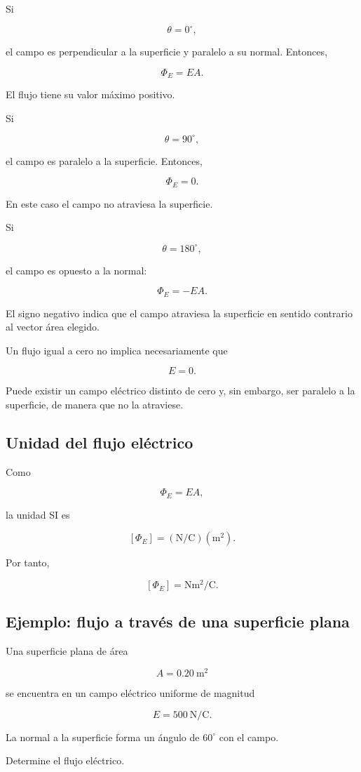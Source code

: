 Si

\[
\theta=0^\circ,
\]

el campo es perpendicular a la superficie y paralelo a su normal. Entonces,

\[
\Phi_E=EA.
\]

El flujo tiene su valor máximo positivo.

Si

\[
\theta=90^\circ,
\]

el campo es paralelo a la superficie. Entonces,

\[
\boxed{\Phi_E=0}.
\]

En este caso el campo no atraviesa la superficie.

Si

\[
\theta=180^\circ,
\]

el campo es opuesto a la normal:

\[
\boxed{\Phi_E=-EA}.
\]

El signo negativo indica que el campo atraviesa la superficie en sentido contrario al
vector área elegido.


\begin{advertencia}

Un flujo igual a cero no implica necesariamente que

\[
E=0.
\]

Puede existir un campo eléctrico distinto de cero y, sin embargo, ser paralelo a la
superficie, de manera que no la atraviese.

\end{advertencia}


\subsection{Unidad del flujo eléctrico}

Como

\[
\Phi_E=EA,
\]

la unidad SI es

\[
[\Phi_E]
=
\left(\si{\newton\per\coulomb}\right)
\left(\si{\metre\squared}\right).
\]

Por tanto,

\[
\boxed{
[\Phi_E]=\si{\newton\metre\squared\per\coulomb}
}.
\]


\subsection{Ejemplo: flujo a través de una superficie plana}

\begin{ejemplo}

Una superficie plana de área

\[
A=\SI{0.20}{\metre\squared}
\]

se encuentra en un campo eléctrico uniforme de magnitud

\[
E=\SI{500}{\newton\per\coulomb}.
\]

La normal a la superficie forma un ángulo de \(60^\circ\) con el campo.

Determine el flujo eléctrico.

\end{ejemplo}

